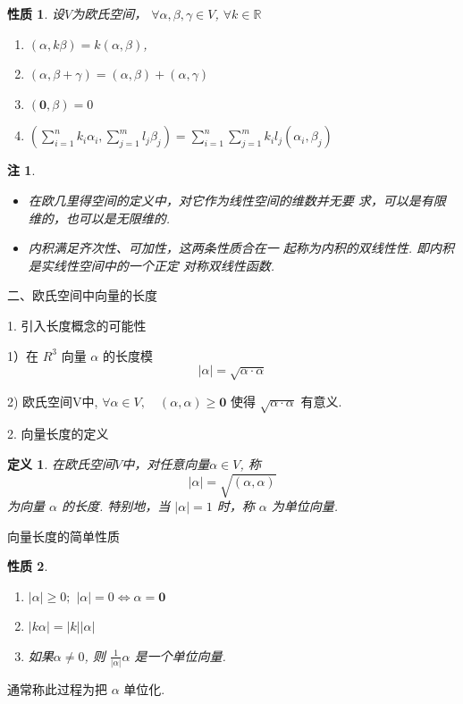 \documentclass[13pt]{beamer}
\newtheorem*{defi}{定义}
\newtheorem*{rem}{注}
\newtheorem*{prop}{性质}
\begin{document}
\begin{frame}
\begin{prop}
设$V$为欧氏空间， 
$\forall \alpha, \beta, \gamma \in {V}$, $\forall k \in \mathbb{R}$
\begin{enumerate}
	\item  $(\alpha, k \beta)=k(\alpha, \beta)$, 
	\item $(\alpha, \beta+\gamma)=(\alpha, \beta)+(\alpha, \gamma)$
	\item   $(\mathbf{0}, \beta)=0$
	\item $\left(\sum_{i=1}^{n} k_{i} \alpha_{i}, \sum_{j=1}^{m} l_{j} \beta_{j}\right)=\sum_{i=1}^{n} \sum_{j=1}^{m} k_{i} l_{j}\left(\alpha_{i}, \beta_{j}\right)$
\end{enumerate}
\end{prop}


\begin{rem}
\begin{itemize}
\item 在欧几里得空间的定义中，对它作为线性空间的维数并无要 求，可以是有限维的，也可以是无限维的. 
\item 内积满足齐次性、可加性，这两条性质合在一
起称为内积的双线性性. 即内积是实线性空间中的一个正定
对称双线性函数. 
\end{itemize}
\end{rem}
\end{frame}
 
 
 \begin{frame}{ 二、欧氏空间中向量的长度}
 
 1. 引入长度概念的可能性
 
 1）在 ${R}^{3}$ 向量 $\alpha$ 的长度模 $$|\alpha|=\sqrt{\alpha \cdot \alpha}$$
 
 2) 欧氏空间V中, $\forall \alpha \in V, \quad(\alpha, \alpha) \geq \mathbf{0}$ 使得 $\sqrt{\alpha \cdot \alpha}$ 有意义.
 
 2. 向量长度的定义

\begin{defi}
 在欧氏空间$V$中，对任意向量$\alpha \in V$,
称 $$|\alpha|=\sqrt{(\alpha, \alpha)}$$ 为向量 $\alpha$ 的长度.
特别地，当 $|\alpha |=1$ 时，称 $\alpha$ 为单位向量.
\end{defi}

 \end{frame}


\begin{frame}{向量长度的简单性质}
\begin{prop}
\begin{enumerate}
	\item $|\alpha| \geq {0}; $  \qquad $|\alpha|={0} \Leftrightarrow \alpha=\mathbf{0}$
	
	\item  $|k \alpha|=|k||\alpha|$
	
	\item 如果$\alpha \neq 0$,  则 $\frac{1}{|\alpha|} \alpha$ 是一个\alert{单位向量}. 
\end{enumerate}
\end{prop}



通常称此过程为把 $\alpha$ \alert{单位化}.
\end{frame}
\end{document}
